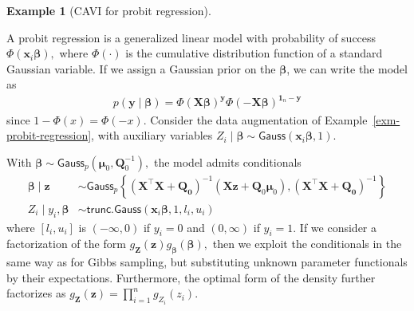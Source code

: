 \documentclass[
  11pt,
  letterpaper,
]{scrbook}
\theoremstyle{definition}
\newtheorem{example}{Example}[chapter]
\theoremstyle{plain}
\theoremstyle{plain}
\theoremstyle{plain}
\theoremstyle{definition}
\theoremstyle{definition}
\theoremstyle{plain}
\theoremstyle{plain}
\theoremstyle{remark}
\begin{document}
\begin{example}[CAVI for probit
regression]\protect\hypertarget{exm-probit-reg-cavi}{}\label{exm-probit-reg-cavi}

A probit regression is a generalized linear model with probability of
success \(\Phi(\mathbf{x}_i\boldsymbol{\beta}),\) where \(\Phi(\cdot)\)
is the cumulative distribution function of a standard Gaussian variable.
If we assign a Gaussian prior on the \(\boldsymbol{\beta}\), we can
write the model as \begin{align*}
p(\boldsymbol{y} \mid \boldsymbol{\beta}) = \Phi(\mathbf{X}\boldsymbol{\beta})^{\boldsymbol{y}}\Phi(-\mathbf{X}\boldsymbol{\beta})^{\boldsymbol{1}_n -\boldsymbol{y}}
\end{align*} since \(1-\Phi(x) = \Phi(-x).\) Consider the data
augmentation of Example~\ref{exm-probit-regression}, with auxiliary
variables
\(Z_i \mid \boldsymbol{\beta}\sim \mathsf{Gauss}(\mathbf{x}_i\boldsymbol{\beta}, 1).\)

With
\(\boldsymbol{\beta} \sim \mathsf{Gauss}_p(\boldsymbol{\mu}_0, \mathbf{Q}_0^{-1}),\)
the model admits conditionals \begin{align*}
\boldsymbol{\beta} \mid \boldsymbol{z} &\sim \mathsf{Gauss}_p\left\{(\mathbf{X}^\top\mathbf{X} + \mathbf{Q_0})^{-1}(\mathbf{X}\boldsymbol{z} + \mathbf{Q}_0\boldsymbol{\mu}_0),  (\mathbf{X}^\top\mathbf{X} + \mathbf{Q_0})^{-1} \right\}
\\
Z_i \mid y_i, \boldsymbol{\beta} &\sim \mathsf{trunc. Gauss}(\mathbf{x}_i\boldsymbol{\beta}, 1, l_i, u_i) 
\end{align*} where \([l_i, u_i]\) is \((-\infty,0)\) if \(y_i=0\) and
\((0, \infty)\) if \(y_i=1.\) If we consider a factorization of the form
\(g_{\boldsymbol{Z}}(\boldsymbol{z})g_{\boldsymbol{\beta}}(\boldsymbol{\beta}),\)
then we exploit the conditionals in the same way as for Gibbs sampling,
but substituting unknown parameter functionals by their expectations.
Furthermore, the optimal form of the density further factorizes as
\(g_{\boldsymbol{Z}}(\boldsymbol{z}) = \prod_{i=1}^n g_{Z_i}(z_i).\)


\end{example}
\end{document}
